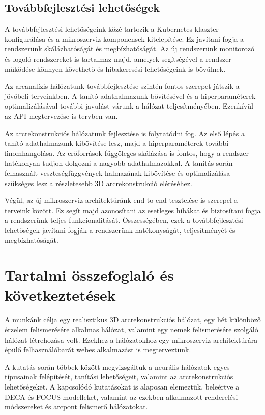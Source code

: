 \documentclass[12pt,a4]{article}
\begin{document}
        \subsection{Továbbfejlesztési lehetőségek}

        A továbbfejlesztési lehetőségeink közé tartozik a Kubernetes klaszter konfigurálása és a mikroszerviz komponensek kitelepítése. Ez javítani fogja a rendszerünk skálázhatóságát és megbízhatóságát. Az új rendszerünk monitorozó és logoló rendszereket is tartalmaz majd, amelyek segítségével a rendszer működése könnyen követhető és hibakeresési lehetőségeink is bővülnek.

        Az arcanalízis hálózatunk továbbfejlesztése szintén fontos szerepet játszik a jövőbeli terveinkben. A tanító adathalmazunk bővítésével és a hiperparaméterek optimalizálásával további javulást várunk a hálózat teljesítményében. Ezenkívül az API megtervezése is tervben van.

        Az arcrekonstrukciós hálózatunk fejlesztése is folytatódni fog. Az első lépés a tanító adathalmazunk kibővítése lesz, majd a hiperparaméterek további finomhangolása. Az erőforrások függőleges skálázása is fontos, hogy a rendszer hatékonyan tudjon dolgozni a nagyobb adathalmazokkal. A tanítás során felhasznált veszteségfüggvények halmazának kibővítése és optimalizálása szükséges lesz a részletesebb 3D arcrekonstrukció eléréséhez.

        Végül, az új mikroszerviz architektúránk end-to-end tesztelése is szerepel a terveink között. Ez segít majd azonosítani az esetleges hibákat és biztosítani fogja a rendszerünk teljes funkcionalitását. Összességében, ezek a továbbfejlesztési lehetőségek javítani fogják a rendszerünk hatékonyságát, teljesítményét és megbízhatóságát.

    \section{Tartalmi összefoglaló és következtetések}

        A munkánk célja egy realisztikus 3D arcrekonstrukciós hálózat, egy hét különböző érzelem felismerésére alkalmas hálózat, valamint egy nemek felismerésére szolgáló hálózat létrehozása volt. Ezekhez a hálózatokhoz egy mikroszerviz architektúrára épülő felhasználóbarát webes alkalmazást is megterveztünk.
        
        A kutatás során többek között megvizsgáltuk a neurális hálózatok egyes típusainak felépítését, tanítási lehetőségeit, valamint az arcrekonstrukciós lehetőségeket. A kapcsolódó kutatásokat is alaposan elemeztük, beleértve a DECA és FOCUS modelleket, valamint az ezekben alkalmazott renderelési módszereket és arcpont felismerő hálózatokat.
        
\end{document}
